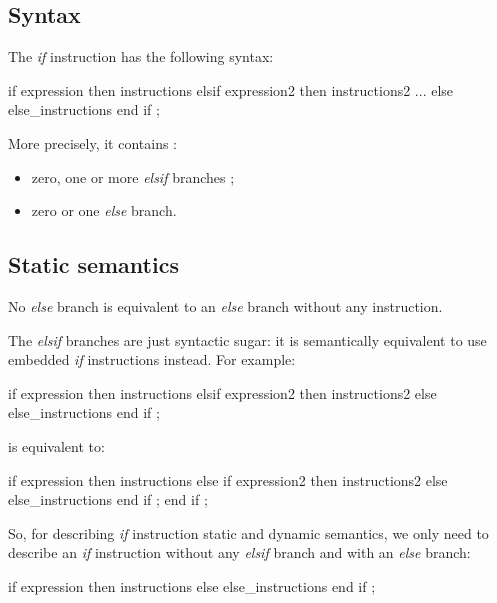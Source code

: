 \subsection{Syntax}

The \emph{if} instruction has the following syntax:
{
\begin{galgascode}
if expression then
  instructions
elsif expression2 then
  instructions2
...
else
  else_instructions
end if ;  
\end{galgascode}
}

More precisely, it contains :
\begin{itemize}
\item zero, one or more \emph{elsif} branches ;
\item zero or one \emph{else} branch.
\end{itemize}


\subsection{Static semantics}


No \emph{else} branch is equivalent to an \emph{else} branch without any instruction.


The \emph{elsif} branches are just syntactic sugar: it is semantically equivalent to use embedded \emph{if} instructions instead. For example:
{
\begin{galgascode}
if expression then
  instructions
elsif expression2 then
  instructions2
else
  else_instructions
end if ;  
\end{galgascode}
}
is equivalent to:
{
\begin{galgascode}
if expression then
  instructions
else
  if expression2 then
    instructions2
  else
    else_instructions
  end if ;  
end if ;  
\end{galgascode}
}

So, for describing \emph{if} instruction static and dynamic semantics, we only need to describe an \emph{if} instruction without any \emph{elsif} branch and with an \emph{else} branch:
{
\begin{galgascode}
if expression then
  instructions
else
  else_instructions
end if ;
\end{galgascode}
}

